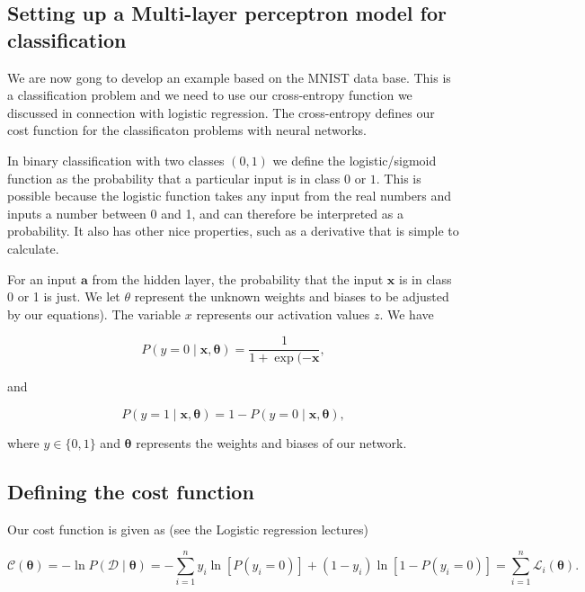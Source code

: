\documentclass[11pt]{article}
\begin{document}
\hypertarget{setting-up-a-multi-layer-perceptron-model-for-classification}{%
\subsection{Setting up a Multi-layer perceptron model for
classification}\label{setting-up-a-multi-layer-perceptron-model-for-classification}}

We are now gong to develop an example based on the MNIST data base. This
is a classification problem and we need to use our cross-entropy
function we discussed in connection with logistic regression. The
cross-entropy defines our cost function for the classificaton problems
with neural networks.

In binary classification with two classes \((0, 1)\) we define the
logistic/sigmoid function as the probability that a particular input is
in class \(0\) or \(1\). This is possible because the logistic function
takes any input from the real numbers and inputs a number between 0 and
1, and can therefore be interpreted as a probability. It also has other
nice properties, such as a derivative that is simple to calculate.

For an input \(\boldsymbol{a}\) from the hidden layer, the probability
that the input \(\boldsymbol{x}\) is in class 0 or 1 is just. We let
\(\theta\) represent the unknown weights and biases to be adjusted by
our equations). The variable \(x\) represents our activation values
\(z\). We have

    \[
P(y = 0 \mid \boldsymbol{x}, \boldsymbol{\theta}) = \frac{1}{1 + \exp (- \boldsymbol{x}} ,
\]

    and

    \[
P(y = 1 \mid \boldsymbol{x}, \boldsymbol{\theta}) = 1 - P(y = 0 \mid \boldsymbol{x}, \boldsymbol{\theta}) ,
\]

    where \(y \in \{0, 1\}\) and \(\boldsymbol{\theta}\) represents the
weights and biases of our network.

\hypertarget{defining-the-cost-function}{%
\subsection{Defining the cost
function}\label{defining-the-cost-function}}

Our cost function is given as (see the Logistic regression lectures)

    \[
\mathcal{C}(\boldsymbol{\theta}) = - \ln P(\mathcal{D} \mid \boldsymbol{\theta}) = - \sum_{i=1}^n
y_i \ln[P(y_i = 0)] + (1 - y_i) \ln [1 - P(y_i = 0)] = \sum_{i=1}^n \mathcal{L}_i(\boldsymbol{\theta}) .
\]
\end{document}
